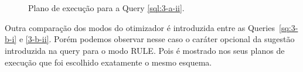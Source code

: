 \documentclass[a4paper,12pt]{article}
\begin{document}
\begin{figure}[hpt]
   \begin{center}
      \\
      \\
   \end{center}
   \caption{Plano de execução para a Query \ref{sql:3-a-ii}.}
   \label{fig:plano_3-a-ii}
\end{figure}

Outra comparação dos modos do otimizador é introduzida entre as Queries~\ref{sq:3-b-i} e \ref{3-b-ii}.
Porém podemos observar nesse caso o caráter opcional da sugestão introduzida na query para o modo RULE.
Pois é mostrado nos seus planos de execução que foi escolhido exatamente o mesmo esquema.

\begin{program}
   
   \caption{Pergunta 3 baseada em junção externa e filtragem para nulo com otimizador no modo CHOOSE.}
   \label{sql:3-b-i}
\end{program}
\end{document}
